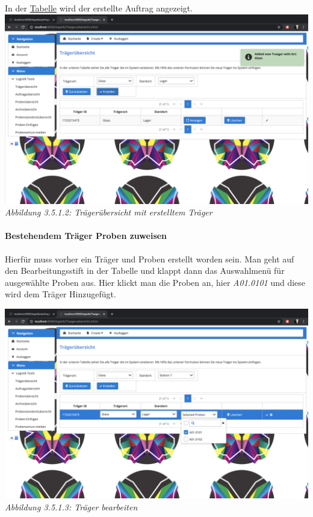 \documentclass[enabledeprecatedfontcommands,fontsize=12pt,paper=a4,twoside]{scrartcl}
\begin{document}
In der \hyperlink{sc3.5.1.2}{Tabelle} wird der erstellte Auftrag angezeigt. \\

\hypertarget{sc3.5.1.2}{
\includegraphics[width=1\textwidth]{Screenshots/3512.png}
\textit{Abbildung 3.5.1.2: Trägerübersicht mit erstelltem Träger}
} \\

\paragraph{Bestehendem Träger Proben zuweisen}

Hierfür muss vorher ein Träger und Proben erstellt worden sein. Man geht auf den Bearbeitungsstift in der Tabelle und klappt dann das Auswahlmenü für ausgewählte Proben aus. Hier klickt man die Proben an, hier \textit{A01.0101} und diese wird dem Träger Hinzugefügt. 

 \hypertarget{sc3.5.1.3}{
\includegraphics[width=1\textwidth]{Screenshots/3513.png}
\textit{Abbildung 3.5.1.3: Träger bearbeiten}
} \\
\end{document}
